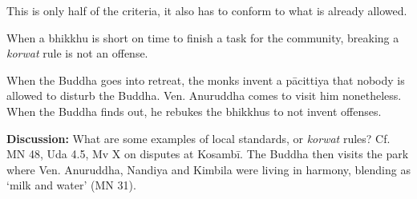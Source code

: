 \begin{exam}{\autoExamName}
\begin{problem*}
\begin{parts}
    \begin{solution}
      This is only half of the criteria, it also has to conform to what is already allowed.
    \end{solution}

    \bigskip

    \item {} When a bhikkhu is short on time to finish a task for the
    community, breaking a \emph{korwat} rule is not an offense.

    \begin{solution}
      When the Buddha goes into retreat, the monks invent a pācittiya that
      nobody is allowed to disturb the Buddha. Ven. Anuruddha comes to visit him
      nonetheless. When the Buddha finds out, he rebukes the bhikkhus to not invent offenses.
    \end{solution}

    \bigskip

    \textbf{Discussion:} What are some examples of local standards, or \emph{korwat}
    rules? Cf. MN 48, Uda 4.5, Mv X on disputes at Kosambī. The Buddha then visits
    the park where Ven. Anuruddha, Nandiya and Kimbila were living in harmony,
    blending as `milk and water' (MN 31).

  \end{parts}

\end{problem*}

\end{exam}











